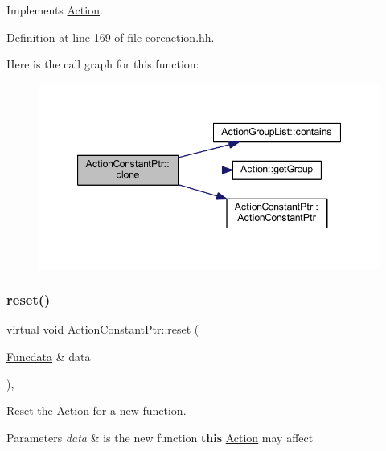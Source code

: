 Implements \mbox{\hyperlink{class_action_af8242e41d09e5df52f97df9e65cc626f}{Action}}.



Definition at line 169 of file coreaction.\+hh.

Here is the call graph for this function\+:
\nopagebreak
\begin{figure}[H]
\begin{center}
\leavevmode
\includegraphics[width=347pt]{class_action_constant_ptr_a03964225abf6a06d0b8eb832a94ce16a_cgraph}
\end{center}
\end{figure}
\mbox{\label{class_action_constant_ptr_a35b17f96c22959446ca3f94420a9f5a2}} 
\subsubsection{\texorpdfstring{reset()}{reset()}}
{\footnotesize\ttfamily virtual void Action\+Constant\+Ptr\+::reset (\begin{DoxyParamCaption}\item[{\mbox{\hyperlink{class_funcdata}{Funcdata}} \&}]{data }\end{DoxyParamCaption})\hspace{0.3cm}{\ttfamily [inline]}, {\ttfamily [virtual]}}



Reset the \mbox{\hyperlink{class_action}{Action}} for a new function. 


\begin{DoxyParams}{Parameters}
{\em data} & is the new function {\bfseries{this}} \mbox{\hyperlink{class_action}{Action}} may affect \\
\hline
\end{DoxyParams}


